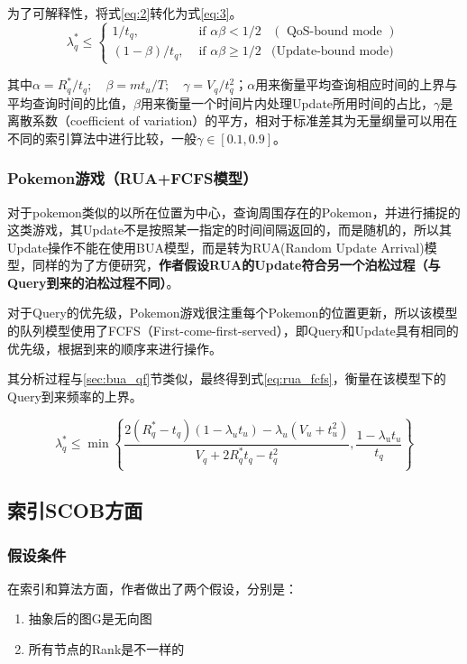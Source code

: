 \documentclass{ML}
\begin{document}
为了可解释性，将式\eqref{eq:2}转化为式\eqref{eq:3}。
\begin{equation}
\lambda_{q}^{*} \leq \left\{
\begin{array}{lll}
{1 / t_{q},} & {\text { if } \alpha \beta<1 / 2} & {(\text { QoS-bound mode })} \\ 
{(1-\beta) / t_{q},} & {\text { if } \alpha \beta \geq 1 / 2} &\text {(Update-bound mode)}
\end{array}
\right.
\label{eq:3}
\end{equation}

其中$\alpha=R_{q}^{*} / t_{q} ; \quad \beta=m t_{u} / T ; \quad \gamma=V_{q} / t_{q}^{2}$；$\alpha$用来衡量平均查询相应时间的上界与平均查询时间的比值，$\beta$用来衡量一个时间片内处理Update所用时间的占比，$\gamma$是离散系数（coefficient of variation）的平方，相对于标准差其为无量纲量可以用在不同的索引算法中进行比较，一般$\gamma \in [0.1, 0.9]$。	

\subsubsection{Pokemon游戏（RUA+FCFS模型）}
对于pokemon类似的以所在位置为中心，查询周围存在的Pokemon，并进行捕捉的这类游戏，其Update不是按照某一指定的时间间隔返回的，而是随机的，所以其Update操作不能在使用BUA模型，而是转为RUA(Random Update Arrival)模型，同样的为了方便研究，\textbf{作者假设RUA的Update符合另一个泊松过程（与Query到来的泊松过程不同）}。

对于Query的优先级，Pokemon游戏很注重每个Pokemon的位置更新，所以该模型的队列模型使用了FCFS（First-come-first-served），即Query和Update具有相同的优先级，根据到来的顺序来进行操作。

其分析过程与\ref{sec:bua_qf}节类似，最终得到式\eqref{eq:rua_fcfs}，衡量在该模型下的Query到来频率的上界。

\begin{equation}
\lambda_{q}^{*} \leq \min \left\{\frac{2\left(R_{q}^{*}-t_{q}\right)\left(1-\lambda_{u} t_{u}\right)-\lambda_{u}\left(V_{u}+t_{u}^{2}\right)}{V_{q}+2 R_{q}^{*} t_{q}-t_{q}^{2}}, \frac{1-\lambda_{\mathrm{u}} t_{u}}{t_{q}}\right\}
\label{eq:rua_fcfs}
\end{equation}

\subsection{索引SCOB方面}

\subsubsection{假设条件}\label{sec:assumptions}
在索引和算法方面，作者做出了两个假设，分别是：
\begin{enumerate}
	\item 抽象后的图G是无向图
	\item 所有节点的Rank是不一样的
\end{enumerate}
\end{document}
